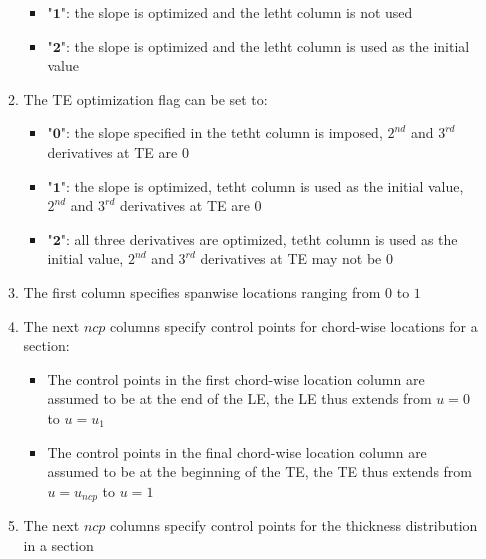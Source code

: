 \documentclass[8pt]{article}
\begin{document}
\begin{itemize}[leftmargin=*]
\begin{enumerate}[label=\alph*]
\begin{itemize}[label=\FilledSmallSquare]
            \item "$\mathbf{1}$": the slope is optimized and the letht column is not used
            \item "$\mathbf{2}$": the slope is optimized and the letht column is used as the initial value
        \end{itemize}
        \item The TE optimization flag can be set to:
        \begin{itemize}[label=\FilledSmallSquare]
            \item "$\mathbf{0}$": the slope specified in the tetht column is imposed, $2^{nd}$ and $3^{rd}$ derivatives at TE are $0$
            \item "$\mathbf{1}$": the slope is optimized, tetht column is used as the initial value, $2^{nd}$ and $3^{rd}$ derivatives at TE are $0$
            \item "$\mathbf{2}$": all three derivatives are optimized, tetht column is used as the initial value, $2^{nd}$ and $3^{rd}$ derivatives at TE may not be $0$
        \end{itemize}
        \item The first column specifies spanwise locations ranging from $0$ to $1$
        \item The next $ncp$ columns specify control points for chord-wise locations for a section:
        \begin{itemize}[label=\FilledSmallSquare]
            \item The control points in the first chord-wise location column are assumed to be at the end of the LE, the LE thus extends from $u = 0$ to $u = u_{1}$
            \item The control points in the final chord-wise location column are assumed to be at the beginning of the TE, the TE thus extends from $u = u_{ncp}$ to $u = 1$
        \end{itemize}
        \item The next $ncp$ columns specify control points for the thickness distribution in a section
    \end{enumerate}
\end{itemize}
\end{document}
